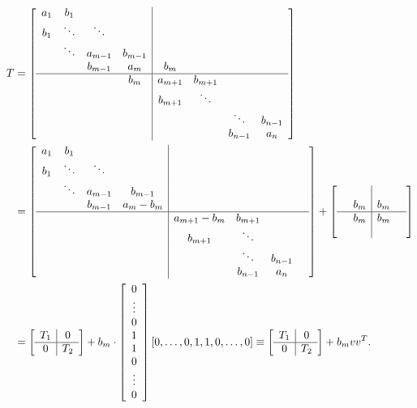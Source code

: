 \documentclass{article}
\begin{document}
\begin{equation}
  \begin{aligned}
    T & =
        \left[
        \begin{array}{cccc|cccc}
          a_1 & b_1 & & & & & & \\
          b_1 & \ddots & \ddots & & & & & \\
              & \ddots & a_{m-1} & b_{m-1} & & & & \\
              & & b_{m-1} & a_m & b_m & & & \\
          \hline & & & b_m & a_{m+1} & b_{m+1} & & \\
              & & & & b_{m+1} & \ddots & & \\
              & & & & & & \ddots & b_{n-1} \\
              & & & & & & b_{n-1} & a_n
        \end{array}\right]\\
      & =\left[
        \begin{array}{cccc|cccc}
          a_1 & b_1 & & & & & & \\
          b_1 & \ddots & \ddots & & & & \\
              & \ddots & a_{m-1} & b_{m-1} & & & & \\
              & & b_{m-1} & a_m-b_m & & & \\
          \hline & & & & a_{m+1}-b_m & b_{m+1} & & \\
              & & & & b_{m+1} & \ddots & & \\
              & & & & & \ddots & b_{n-1} \\
              & & & & & b_{n-1} & a_n
        \end{array}\right]
        + \left[
        \begin{array}{cc|cc}
          & 	&  &  \\
          & b_m & b_m &  \\\hline
          & b_m & b_m &  \\
          &  & &
        \end{array}\right] \\
      & = \left[\begin{array}{c|c}
                  T_1 & 0 \\
                  \hline 0 & T_2
                \end{array}
        \right]+b_m \cdot\left[
        \begin{array}{c}
          0 \\
          \vdots \\
          0 \\
          1 \\
          1 \\
          0 \\
          \vdots \\
          0
        \end{array}\right][0, \ldots, 0,1,1,0, \ldots, 0] \equiv\left[
        \begin{array}{c|c}
          T_1 & 0 \\
          \hline 0 & T_2
        \end{array}\right]+b_m v v^T .
  \end{aligned}
\end{equation}
\end{document}

